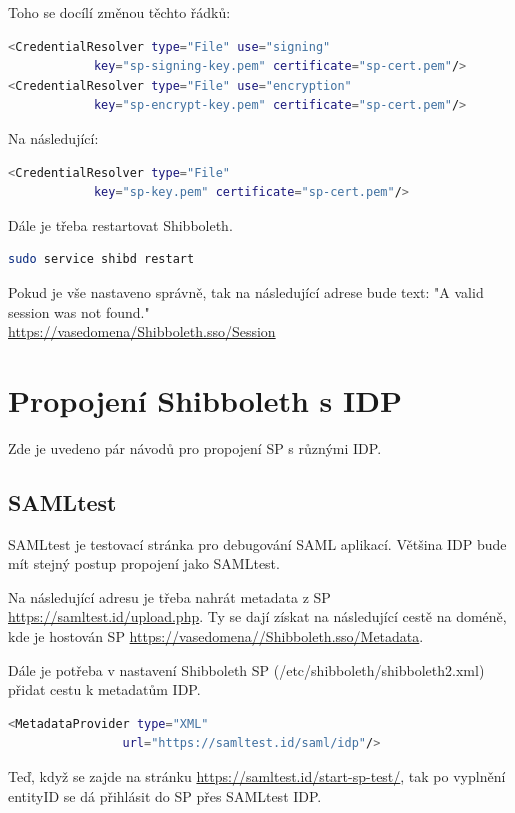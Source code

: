 Toho se docílí změnou těchto řádků:
\begin{lstlisting}[language=Bash]
<CredentialResolver type="File" use="signing"
            key="sp-signing-key.pem" certificate="sp-cert.pem"/>
<CredentialResolver type="File" use="encryption"
            key="sp-encrypt-key.pem" certificate="sp-cert.pem"/>
\end{lstlisting}

Na následující:
\begin{lstlisting}[language=Bash]
<CredentialResolver type="File"
            key="sp-key.pem" certificate="sp-cert.pem"/>
\end{lstlisting}

Dále je třeba restartovat Shibboleth.
\begin{lstlisting}[language=Bash]
sudo service shibd restart
\end{lstlisting}

Pokud je vše nastaveno správně, tak na následující adrese bude text: "A valid session was not found."\\
\url{https://vasedomena/Shibboleth.sso/Session}

\section{Propojení Shibboleth s IDP}

Zde je uvedeno pár návodů pro propojení SP s různými IDP.

\subsection{SAMLtest}
SAMLtest je testovací stránka pro debugování SAML aplikací. Většina IDP bude mít stejný postup propojení jako SAMLtest.



Na následující adresu je třeba nahrát metadata z SP 
\url{https://samltest.id/upload.php}. Ty se dají získat na následující cestě na doméně, kde je hostován SP \url{https://vasedomena//Shibboleth.sso/Metadata}.

Dále je potřeba v nastavení Shibboleth SP (/etc/shibboleth/shibboleth2.xml) přidat cestu k metadatům IDP.
\begin{lstlisting}[language=Bash]
 <MetadataProvider type="XML"
                url="https://samltest.id/saml/idp"/>
\end{lstlisting}

Teď, když se zajde na stránku \url{https://samltest.id/start-sp-test/}, tak po vyplnění entityID se dá přihlásit do SP přes SAMLtest IDP.

